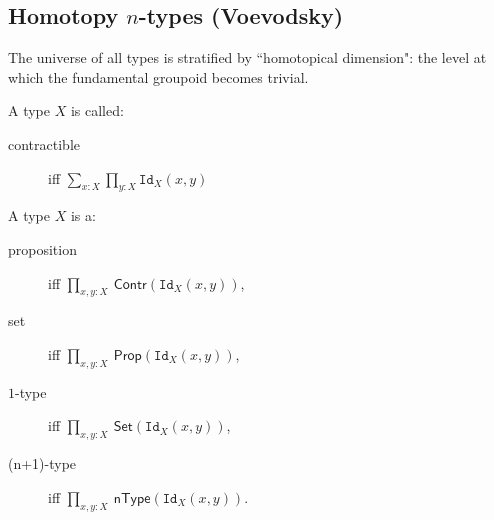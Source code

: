 \documentclass[11pt]{article}
\newcommand{\id}[1]{\texttt{Id}_{#1}}
\begin{document}
\subsection*{Homotopy $n$-types (Voevodsky)}

The universe of all types is  stratified by ``homotopical dimension": the level at which the fundamental groupoid becomes trivial.
\medskip

A type $X$ is called:
\begin{description}
\item[contractible] iff \quad $\sum_{x:X}\prod_{y:X}\id{X}(x,y)$
\end{description}
\medskip

A type $X$ is a:
\begin{description}
\item[proposition] iff \quad $\prod_{x,y:X}\ \mathsf{Contr}(\id{X}(x,y))$,%
\item[set] iff \quad $\prod_{x,y:X}\ \mathsf{Prop}(\id{X}(x,y))$,%
\item[$1$-type] iff \quad $\prod_{x,y:X}\ \mathsf{Set}(\id{X}(x,y))$,%
\item[(n+1)-type] iff \quad $\prod_{x,y:X}\ \mathsf{nType}(\id{X}(x,y))$.
\end{description}
\medskip
\end{document}
